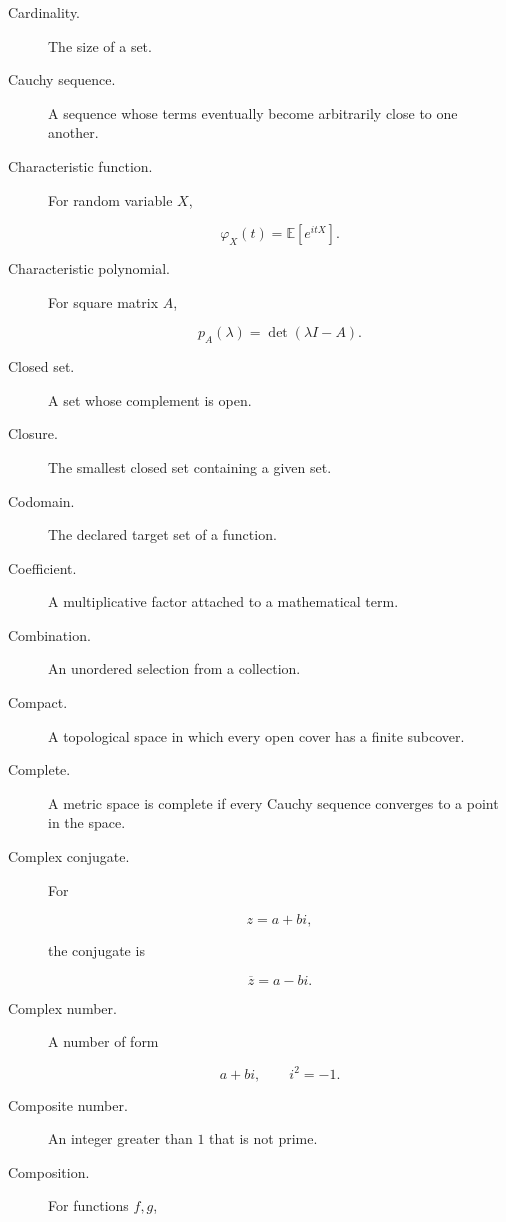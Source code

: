 \begin{description}

\item[Cardinality.]
The size of a set.

\item[Cauchy sequence.]
A sequence whose terms eventually become arbitrarily close to one another.

\item[Characteristic function.]
For random variable \(X\),

\[
\varphi_X(t)
=
\mathbb{E}[e^{itX}].
\]

\item[Characteristic polynomial.]
For square matrix \(A\),

\[
p_A(\lambda)
=
\det(\lambda I-A).
\]

\item[Closed set.]
A set whose complement is open.

\item[Closure.]
The smallest closed set containing a given set.

\item[Codomain.]
The declared target set of a function.

\item[Coefficient.]
A multiplicative factor attached to a mathematical term.

\item[Combination.]
An unordered selection from a collection.

\item[Compact.]
A topological space in which every open cover has a finite subcover.

\item[Complete.]
A metric space is complete if every Cauchy sequence converges to a point in
the space.

\item[Complex conjugate.]
For

\[
z=a+bi,
\]

the conjugate is

\[
\overline{z}
=
a-bi.
\]

\item[Complex number.]
A number of form

\[
a+bi,
\qquad
i^2=-1.
\]

\item[Composite number.]
An integer greater than \(1\) that is not prime.

\item[Composition.]
For functions \(f,g\),


\end{description}
